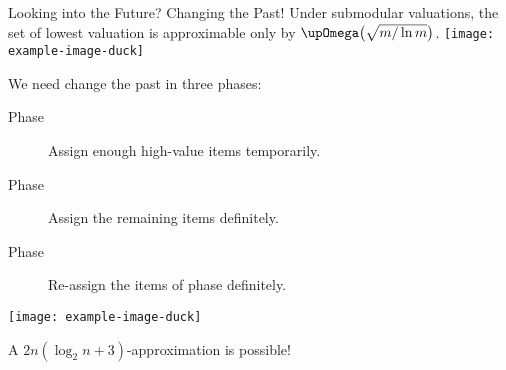 
\begin{frame}{Looking into the Future? Changing the Past!}
	Under submodular valuations, the set of lowest valuation is approximable only by \(\bigomega\paren[\big]{ \sqrt{m/\ln m} }\). \smash{\raisebox{-.25ex}{\Large\Lightning}}
	\texttt{[image: example-image-duck]}

	We need change the past in three phases:
	\begin{description}
		\item[Phase \phasei]
		Assign enough high-value items temporarily.

		\item[Phase \phaseii]
		Assign the remaining items definitely.

		\item[Phase \phaseiii]
		Re-assign the items of phase \phasei{} definitely.
	\end{description}
	\begin{center}
		\texttt{[image: example-image-duck]}
	\end{center}
	\begin{exampleblock}{}
		A \(2n (\log_2 n + 3)\)-approximation is possible!
	\end{exampleblock}
\end{frame}





